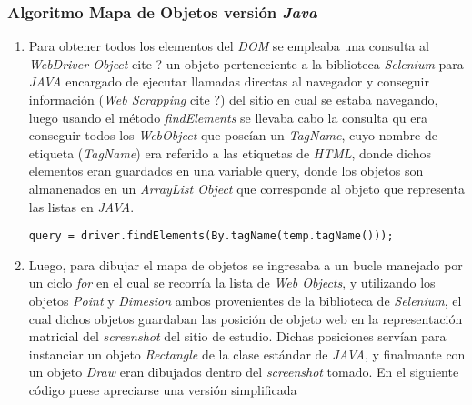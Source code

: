         \subsubsection{Algoritmo Mapa de Objetos versión \textit{Java}}
        
        
        \begin{enumerate}
         \item Para obtener todos los elementos del \textit{DOM} se empleaba una consulta al 
         \textit{WebDriver Object} cite ? un objeto perteneciente a la biblioteca \textit{Selenium} 	
         para
         \textit{JAVA} encargado de ejecutar llamadas directas al navegador y conseguir información
         (\textit{Web Scrapping} cite ?) del sitio en cual se estaba navegando, luego usando el 
         método \textit{findElements} se llevaba cabo la consulta qu era conseguir todos los 
         \textit{WebObject} que poseían un \textit{TagName}, cuyo nombre de etiqueta 
         (\textit{TagName}) era referido a las etiquetas de \textit{HTML}, donde dichos elementos
         eran guardados en una variable query, donde los objetos son almanenados en un 
         \textit{ArrayList Object} que corresponde al objeto que representa las listas en 
         \textit{JAVA}.
			\begin{lstlisting}[style=Java, caption={Obtención \textit{WebObjects}.}]
           	query = driver.findElements(By.tagName(temp.tagName()));
\end{lstlisting}
		\item Luego, para dibujar el mapa de objetos se ingresaba a un bucle manejado por un ciclo
		\textit{for} en el cual se recorría la lista de \textit{Web Objects}, y utilizando los 
		objetos \textit{Point} y \textit{Dimesion} ambos provenientes de la biblioteca de 
		\textit{Selenium}, el cual dichos objetos guardaban las posición de objeto web 
		en la representación matricial del \textit{screenshot} del sitio de estudio. Dichas
		posiciones servían para instanciar un objeto \textit{Rectangle} de la clase estándar
		de \textit{JAVA}, y finalmante con un objeto \textit{Draw} eran dibujados dentro del 
		\textit{screenshot} tomado. En el siguiente código puese apreciarse una versión simplificada

\end{enumerate}
